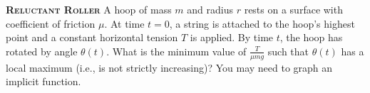 \begin{problem}{\textsc{\textbf{Reluctant Roller}}}
A hoop of mass $m$ and radius $r$ rests on a surface with coefficient of friction $\mu$. At time $t=0$, a string is attached to the hoop's highest point and a constant horizontal tension $T$ is applied. By time $t$, the hoop has rotated by angle $\theta(t)$. What is the minimum value of $\displaystyle\frac{T}{\mu mg}$ such that $\theta(t)$ has a local maximum (i.e., is not strictly increasing)? You may need to graph an implicit function.
\vspace{-0.5cm}
\begin{center}
\end{center}
\end{problem}